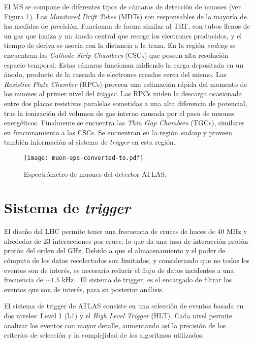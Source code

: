 El MS se compone de diferentes tipos de cámaras de detección de muones (ver Figura \ref{muon}). Las \textit{Monitored Drift Tubes} (MDTs) son responsables de la mayoría de las medidas de precisión. Funcionan de forma similar al TRT, con tubos llenos de un gas que ioniza y un ánodo central que recoge los electrones producidos, y el tiempo de deriva se asocia con la distancia a la traza. En la región \textit{endcap} se encuentran las \textit{Cathode Strip Chambers} (CSCs) que poseen alta resolución espacio-temporal. Estas cámaras funcionan midiendo la carga depositada en un ánodo, producto de la cascada de electrones creados cerca del mismo. Las \textit{Resistive Plate Chamber} (RPCs) proveen una estimación rápida del momento de los muones al primer nivel del \textit{trigger}. Las RPCs miden la descarga ocasionada entre dos placas resistivas paralelas sometidas a una alta diferencia de potencial, tras la ionización del volumen de gas interno causada por el paso de muones energéticos. Finalmente se encuentra las \textit{Thin Gap Chambers} (TGCs), similares en funcionamiento a las CSCs. Se encuentran en la región \textit{endcap} y proveen también información al sistema de \textit{trigger} en esta región.


\begin{figure}
\centering
\texttt{[image: muon-eps-converted-to.pdf]}
\caption{Espectrómetro de muones del detector ATLAS.}
\label{muon}
\end{figure}



\section{Sistema de \textit{trigger}}

El diseño del LHC permite tener una frecuencia de cruces de haces de 40 MHz y alrededor de 23 interacciones por cruce, lo que da una tasa de interacción protón-protón del orden del GHz. Debido a que el almacenamiento y el poder de cómputo de los datos recolectados son limitados, y considerando que no todos los eventos son de interés, es necesario reducir el flujo de datos incidentes a una frecuencia de $\sim 1.5$ kHz \cite{PERF-2011-02}. El sistema de trigger, es el encargado de filtrar los eventos que son de interés, para su posterior análisis. 

El sistema de trigger de ATLAS consiste en una selección de eventos basada en dos niveles: Level 1 (L1) y el \textit{High Level Trigger} (HLT). Cada nivel permite analizar los eventos con mayor detalle, aumentando así la precisión de los criterios de selección y la complejidad de los algoritmos utilizados.



